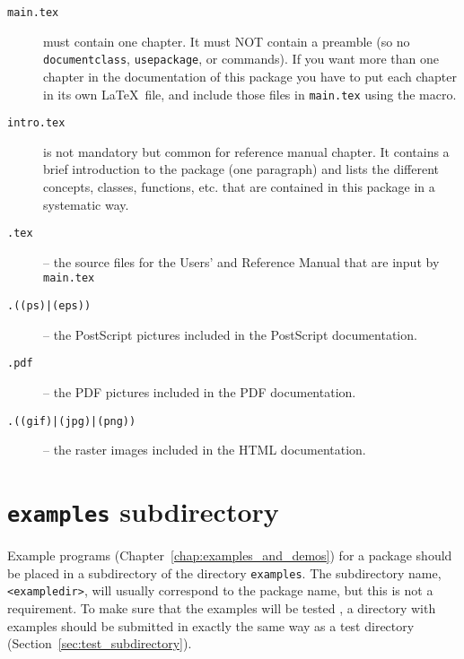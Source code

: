 \begin{description}
 \item[{\tt main.tex}]%
       must contain one chapter. It must NOT 
      contain a preamble (so no {\tt documentclass}, {\tt usepackage}, 
      \verb|| or \verb|| commands). 
      If you want more than one chapter in the documentation of this
      package you have to put each chapter in its own \LaTeX\ file,
      and include those files in \texttt{main.tex} using the \verb||
      macro.
 \item[{\tt intro.tex}]%
      is not mandatory but common for reference manual chapter. It
      contains a brief introduction to the package (one paragraph) and
      lists the different concepts, classes, functions, etc. that are
      contained in this package in a systematic way.
 \item[{\tt *.tex}] -- the source files for the Users' and Reference
      Manual that are input by {\tt main.tex} 
 \item[{\tt *.((ps)|(eps))}] -- the PostScript pictures included in
        the PostScript documentation.
 \item[{\tt *.pdf}] -- the PDF pictures included in
        the PDF documentation.
 \item[{\tt *.((gif)|(jpg)|(png))}] -- the raster images included in
        the HTML documentation.
\end{description}


\section{{\tt examples} subdirectory}
\label{sec:examples_subdirectory}

Example programs (Chapter~\ref{chap:examples_and_demos}) for a package should 
be placed in a subdirectory of the directory {\tt examples}. 
The subdirectory name, \verb|<exampledir>|, will usually correspond to the 
package name, but this is not a requirement.
To make sure that the examples will be tested%
, 
a directory with examples 
should be submitted in exactly the same way as a test directory 
(Section~\ref{sec:test_subdirectory}). 

